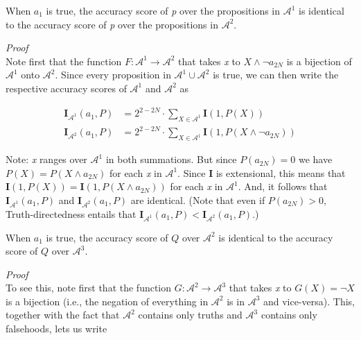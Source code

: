 \documentclass[
  10pt,
  letterpaper,
  DIV=11,
  numbers=noendperiod,
  twoside]{scrartcl}
\providecommand{\tightlist}{%
  \setlength{\itemsep}{0pt}\setlength{\parskip}{0pt}}\usepackage{longtable,booktabs,array}
\begin{document}
\begin{description}
\tightlist
\item[Lemma-3.1]
When \(a_1\) is true, the accuracy score of \emph{p} over the
propositions in \(\mathscr{A}^1\) is identical to the accuracy score of
\emph{p} over the propositions in \(\mathscr{A}^2\).
\end{description}

\emph{Proof}\\
Note first that the function
\(F: \mathscr{A}^1 \rightarrow \mathscr{A}^2\) that takes \emph{x} to
\(X \wedge \neg a_{2N}\) is a bijection of \(\mathscr{A}^1\) onto
\(\mathscr{A}^2\). Since every proposition in
\(\mathscr{A}^1 \cup \mathscr{A}^2\) is true, we can then write the
respective accuracy scores of \(\mathscr{A}^1\) and \(\mathscr{A}^2\) as

\[
\begin{aligned}
\mathbf{I}_{\mathscr{A}^1}(a_1, P) &= 2^{2-2N} \cdot \sum_{X \in \mathscr{A}^1} \mathbf{I}(1, P(X)) \\
\mathbf{I}_{\mathscr{A}^2}(a_1, P) &= 2^{2-2N} \cdot \sum_{X \in \mathscr{A}^1} \mathbf{I}(1, P(X \wedge \neg a_{2N}))
\end{aligned}
\]

Note: \emph{x} ranges over \(\mathscr{A}^1\) in both summations. But
since \(P(a_{2N}) = 0\) we have \(P(X) = P(X \wedge a_{2N})\) for each
\emph{x} in \(\mathscr{A}^1\). Since \textbf{I} is extensional, this
means that \(\mathbf{I}(1, P(X)) = \mathbf{I}(1, P(X \wedge a_{2N}))\)
for each \emph{x} in \(\mathscr{A}^1\). And, it follows that
\(\mathbf{I}_{\mathscr{A}^1}(a_1, P)\) and
\(\mathbf{I}_{\mathscr{A}^2}(a_1, P)\) are identical. (Note that even if
\(P(a_{2N}) > 0\), Truth-directedness entails that
\(\mathbf{I}_{\mathscr{A}^1}(a_1, P) < \mathbf{I}_{\mathscr{A}^2}(a_1, P)\).)

\begin{description}
\tightlist
\item[Lemma-3.2]
When \(a_1\) is true, the accuracy score of \(Q\) over \(\mathscr{A}^2\)
is identical to the accuracy score of \(Q\) over \(\mathscr{A}^3\).
\end{description}

\emph{Proof}\\
To see this, note first that the function
\(G: \mathscr{A}^2 \rightarrow \mathscr{A}^3\) that takes \emph{x} to
\(G(X) = \neg X\) is a bijection (i.e., the negation of everything in
\(\mathscr{A}^2\) is in \(\mathscr{A}^3\) and vice-versa). This,
together with the fact that \(\mathscr{A}^2\) contains only truths and
\(\mathscr{A}^3\) contains only falsehoods, lets us write
\end{document}
